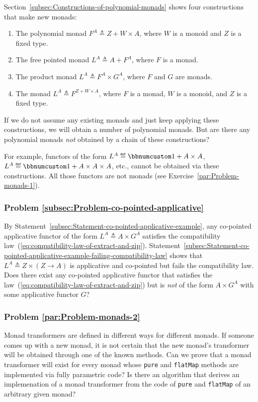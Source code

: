 Section~\ref{subsec:Constructions-of-polynomial-monads} shows four
constructions that make new monads:
\begin{enumerate}
\item The polynomial monad $F^{A}\triangleq Z+W\times A$, where $W$ is
a monoid and $Z$ is a fixed type.
\item The free pointed monad $L^{A}\triangleq A+F^{A}$, where $F$ is a
monad.
\item The product monad $L^{A}\triangleq F^{A}\times G^{A}$, where $F$
and $G$ are monads.
\item The monad $L^{A}\triangleq F^{Z+W\times A}$, where $F$ is a monad,
$W$ is a monoid, and $Z$ is a fixed type.
\end{enumerate}
If we do not assume any existing monads and just keep applying these
constructions, we will obtain a number of polynomial monads. But are
there any polynomial monads \emph{not} obtained by a chain of these
constructions?

For example, functors of the form $L^{A}\triangleq\bbnum 1+A\times A$,
$L^{A}\triangleq\bbnum 1+A\times A\times A$, etc., cannot be obtained
via these constructions. All those functors are not monads (see Exercise~\ref{par:Problem-monads-1}).

\subsubsection{Problem \label{subsec:Problem-co-pointed-applicative}\ref{subsec:Problem-co-pointed-applicative}}

By Statement~\ref{subsec:Statement-co-pointed-applicative-example},
any co-pointed applicative functor of the form $L^{A}\triangleq A\times G^{A}$
satisfies the compatibility law~(\ref{eq:compatibility-law-of-extract-and-zip}).
Statement~\ref{subsec:Statement-co-pointed-applicative-example-failing-compatibility-law}
shows that $L^{A}\triangleq Z\times\left(Z\rightarrow A\right)$ is
applicative and co-pointed but fails the compatibility law. Does there
exist any co-pointed applicative functor that satisfies the law~(\ref{eq:compatibility-law-of-extract-and-zip})
but is \emph{not} of the form $A\times G^{A}$ with some applicative
functor $G$? 

\subsubsection{Problem \label{par:Problem-monads-2}\ref{par:Problem-monads-2}}

Monad transformers are defined in different ways for different monads.
If someone comes up with a new monad, it is not certain that the new
monad\textsf{'}s transformer will be obtained through one of the known methods.
Can we prove that a monad transformer will exist for every monad whose
\lstinline!pure! and \lstinline!flatMap! methods are implemented
via fully parametric code? Is there an algorithm that derives an implemenation
of a monad transformer from the code of \lstinline!pure! and \lstinline!flatMap!
of an arbitrary given monad?

